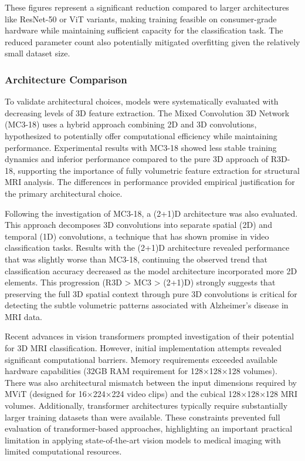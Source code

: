 \documentclass[11pt, a4paper]{article}
\begin{document}
These figures represent a significant reduction compared to larger architectures like ResNet-50 or ViT variants, making training feasible on consumer-grade hardware while maintaining sufficient capacity for the classification task. The reduced parameter count also potentially mitigated overfitting given the relatively small dataset size.

\subsubsection{Architecture Comparison}

To validate architectural choices, models were systematically evaluated with decreasing levels of 3D feature extraction. The Mixed Convolution 3D Network (MC3-18) uses a hybrid approach combining 2D and 3D convolutions, hypothesized to potentially offer computational efficiency while maintaining performance. Experimental results with MC3-18 showed less stable training dynamics and inferior performance compared to the pure 3D approach of R3D-18, supporting the importance of fully volumetric feature extraction for structural MRI analysis. The differences in performance provided empirical justification for the primary architectural choice.

Following the investigation of MC3-18, a (2+1)D architecture was also evaluated. This approach decomposes 3D convolutions into separate spatial (2D) and temporal (1D) convolutions, a technique that has shown promise in video classification tasks. Results with the (2+1)D architecture revealed performance that was slightly worse than MC3-18, continuing the observed trend that classification accuracy decreased as the model architecture incorporated more 2D elements. This progression (R3D > MC3 > (2+1)D) strongly suggests that preserving the full 3D spatial context through pure 3D convolutions is critical for detecting the subtle volumetric patterns associated with Alzheimer's disease in MRI data.

Recent advances in vision transformers prompted investigation of their potential for 3D MRI classification. However, initial implementation attempts revealed significant computational barriers. Memory requirements exceeded available hardware capabilities (32GB RAM requirement for 128×128×128 volumes). There was also architectural mismatch between the input dimensions required by MViT (designed for 16×224×224 video clips) and the cubical 128×128×128 MRI volumes. Additionally, transformer architectures typically require substantially larger training datasets than were available. These constraints prevented full evaluation of transformer-based approaches, highlighting an important practical limitation in applying state-of-the-art vision models to medical imaging with limited computational resources.
\end{document}
